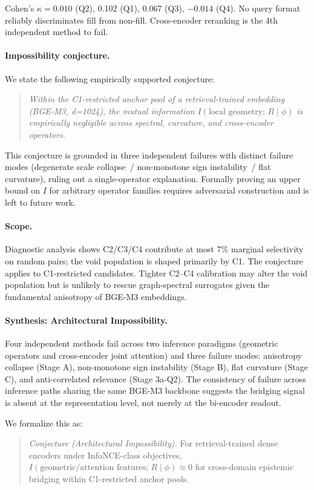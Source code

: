 \documentclass[11pt,twocolumn]{article}
\begin{document}
Cohen's $\kappa = 0.010$ (Q2), 0.102 (Q1), 0.067 (Q3), $-0.014$ (Q4). No query format
reliably discriminates fill from non-fill. Cross-encoder reranking is the 4th
independent method to fail.

\paragraph{Impossibility conjecture.}
We state the following empirically supported conjecture:
\begin{quote}\small
\emph{Within the C1-restricted anchor pool of a retrieval-trained embedding
(BGE-M3, d=1024), the mutual information $I(\text{local geometry};\,R\mid\phi)$
is empirically negligible across spectral, curvature, and cross-encoder operators.}
\end{quote}
This conjecture is grounded in three independent failures with distinct
failure modes (degenerate scale collapse~/ non-monotone sign instability~/ flat
curvature), ruling out a single-operator explanation. Formally proving an upper
bound on $I$ for arbitrary operator families requires adversarial construction
and is left to future work.

\paragraph{Scope.}
Diagnostic analysis shows C2/C3/C4 contribute at most 7\% marginal
selectivity on random pairs; the void population is shaped primarily by C1.
The conjecture applies to C1-restricted candidates. Tighter C2--C4 calibration
may alter the void population but is unlikely to rescue graph-spectral
surrogates given the fundamental anisotropy of BGE-M3 embeddings.

\paragraph{Synthesis: Architectural Impossibility.}
Four independent methods fail across two inference paradigms (geometric
operators and cross-encoder joint attention) and three failure modes:
anisotropy collapse (Stage A), non-monotone sign instability (Stage B),
flat curvature (Stage C), and anti-correlated relevance (Stage 3a-Q2).
The consistency of failure across inference paths sharing the same BGE-M3
backbone suggests the bridging signal is absent at the representation
level, not merely at the bi-encoder readout.

We formalize this as:
\begin{quote}\small
\emph{Conjecture (Architectural Impossibility).} For retrieval-trained dense
encoders under InfoNCE-class objectives, $I(\text{geometric/attention
features};\,R\mid\phi) \approx 0$ for cross-domain epistemic bridging
within C1-restricted anchor pools.
\end{quote}
\end{document}
